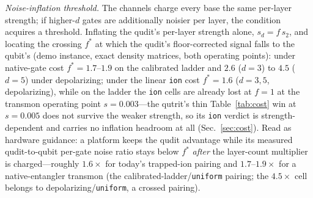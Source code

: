 \documentclass[aps,pra,reprint,superscriptaddress,nofootinbib,floatfix]{revtex4-2}
\begin{document}
\emph{Noise-inflation threshold.} The channels charge every base the
same per-layer strength; if higher-$d$ gates are additionally noisier
per layer, the condition acquires a threshold. Inflating the qudit's
per-layer strength alone, $s_d=f\,s_2$, and locating the crossing
$f^\ast$ at which the qudit's floor-corrected signal falls to the
qubit's (demo instance, exact density matrices, both operating
points): under native-gate cost $f^\ast=1.7$--$1.9$ on the calibrated
ladder and $2.6$ ($d{=}3$) to $4.5$ ($d{=}5$) under depolarizing;
under the linear \texttt{ion} cost $f^\ast=1.6$ ($d{=}3,5$,
depolarizing), while on the ladder the \texttt{ion} cells are
already lost at $f=1$ at the transmon operating point $s=0.003$---the
qutrit's thin Table~\ref{tab:cost} win at $s=0.005$ does not survive
the weaker strength, so its \texttt{ion} verdict is
strength-dependent and carries no inflation headroom at all
(Sec.~\ref{sec:cost}). Read as hardware
guidance: a platform keeps the qudit advantage while its measured
qudit-to-qubit per-gate noise ratio stays below $f^\ast$ \emph{after}
the layer-count multiplier is charged---roughly $1.6\times$ for
today's trapped-ion pairing and $1.7$--$1.9\times$ for a
native-entangler transmon (the calibrated-ladder/\texttt{uniform}
pairing; the $4.5\times$ cell belongs to
depolarizing/\texttt{uniform}, a crossed pairing).
\end{document}
